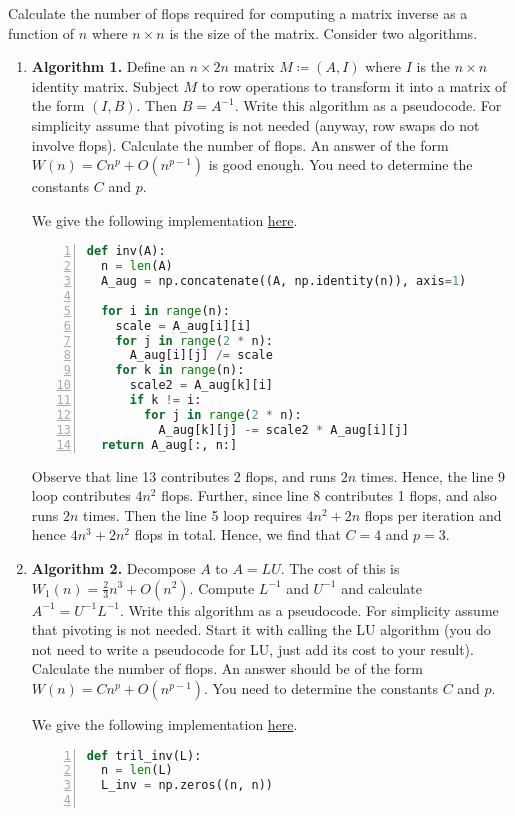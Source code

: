 \documentclass{../../../kin_math}
\begin{document}
\begin{questions}
  \question Calculate the number of flops required for computing a matrix inverse as a function of $n$ where $n \times n$ is the size of the matrix. Consider two algorithms.
  \begin{enumerate}
    \item \textbf{Algorithm 1.} Define an $n \times 2n$ matrix $M \coloneqq (A, I)$ where $I$ is the $n \times n$ identity matrix. Subject $M$ to row operations to transform it into a matrix of the form $(I, B)$. Then $B = A^{-1}$. Write this algorithm as a pseudocode. For simplicity assume that pivoting is not needed (anyway, row swaps do not involve flops). Calculate the number of flops. An answer of the form $W(n) = Cn^p + O(n^{p - 1})$ is good enough. You need to determine the constants $C$ and $p$.
    \begin{solution}
      We give the following implementation \href{https://github.com/elijahkin/school/blob/main/umd/amsc660/hw5/hw5.ipynb}{here}.
      \begin{lstlisting}[language=python, numbers=left, xleftmargin=5em]
def inv(A):
  n = len(A)
  A_aug = np.concatenate((A, np.identity(n)), axis=1)

  for i in range(n):
    scale = A_aug[i][i]
    for j in range(2 * n):
      A_aug[i][j] /= scale
    for k in range(n):
      scale2 = A_aug[k][i]
      if k != i:
        for j in range(2 * n):
          A_aug[k][j] -= scale2 * A_aug[i][j]
  return A_aug[:, n:]
      \end{lstlisting}
      Observe that line 13 contributes 2 flops, and runs $2n$ times. Hence, the line 9 loop contributes $4n^2$ flops. Further, since line 8 contributes 1 flops, and also runs $2n$ times. Then the line 5 loop requires $4n^2 + 2n$ flops per iteration and hence $4n^3 + 2n^2$ flops in total. Hence, we find that $C = 4$ and $p = 3$.
    \end{solution}
    \item \textbf{Algorithm 2.} Decompose $A$ to $A = LU$. The cost of this is $W_1(n) = \frac{2}{3} n^3 + O(n^2)$. Compute $L^{-1}$ and $U^{-1}$ and calculate $A^{-1} = U^{-1}L^{-1}$. Write this algorithm as a pseudocode. For simplicity assume that pivoting is not needed. Start it with calling the LU algorithm (you do not need to write a pseudocode for LU, just add its cost to your result). Calculate the number of flops. An answer should be of the form $W(n) = Cn^p + O(n^{p - 1})$. You need to determine the constants $C$ and $p$.
    \begin{solution}
      We give the following implementation \href{https://github.com/elijahkin/school/blob/main/umd/amsc660/hw5/hw5.ipynb}{here}.
      \begin{lstlisting}[language=python, numbers=left, xleftmargin=5em]
def tril_inv(L):
  n = len(L)
  L_inv = np.zeros((n, n))


\end{lstlisting}
\end{solution}
\end{enumerate}
\end{questions}
\end{document}
